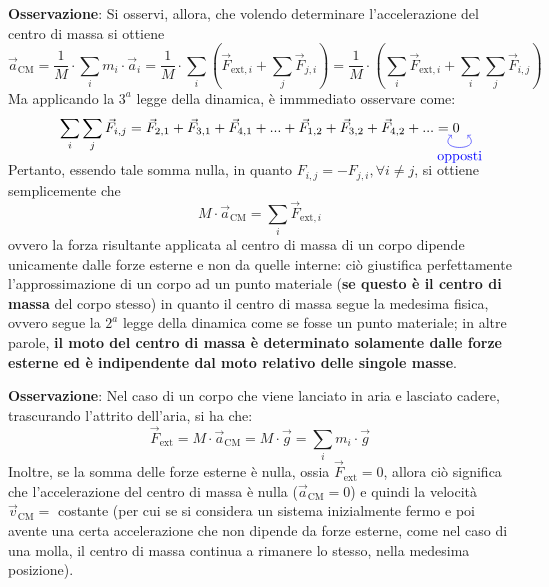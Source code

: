\documentclass[a4paper]{extarticle}
\begin{document}
\vspace{1em}
\noindent
\newcommand{\tikzmark}[1]{\tikz[overlay,remember picture] \node (#1) {};}
\textbf{Osservazione}: Si osservi, allora, che volendo determinare l'accelerazione del centro di massa si ottiene
\[\vec a_{\text{CM}} = \frac{1}{M} \cdot \sum_i m_i \cdot \vec a_i = \frac{1}{M} \cdot \sum_i \left( \vec F_{\text{ext},i} + \sum_j \vec F_{j,i} \right) = \frac{1}{M} \cdot \left(\sum_i \vec F_{\text{ext},i} + \sum_i \sum_j \vec F_{i,j}\right)\]
Ma applicando la $3^a$ legge della dinamica, è immmediato osservare come:
\begin{equation*}
  \sum_i \sum_j \vec F_{i,j} = \tikzmark{a} \vec F_{2,1} + \vec F_{3,1} + \vec F_{4,1} + ... + \vec F_{1,2} \tikzmark{b} + \vec F_{3,2} + \vec F_{4,2} + ... = 0
  \begin{tikzpicture}[overlay,remember picture,out=315,in=225,distance=0.7cm]
      \draw[<->,blue,shorten >=3pt,shorten <=3pt] (a.east) to node[midway,below](n){opposti} (b.west);
  \end{tikzpicture}
\end{equation*}
Pertanto, essendo tale somma nulla, in quanto $F_{i,j}=-F_{j,i}, \forall i \neq j$, si ottiene semplicemente che
\[\boxed{M \cdot \vec a_{\text{CM}} = \sum_i \vec F_{\text{ext},i}}\]
ovvero la forza risultante applicata al centro di massa di un corpo dipende unicamente dalle forze esterne e non da quelle interne: ciò giustifica perfettamente l'approssimazione di un corpo ad un punto materiale (\textbf{se questo è il centro di massa} del corpo stesso) in quanto il centro di massa segue la medesima fisica, ovvero segue la $2^a$ legge della dinamica come se fosse un punto materiale; in altre parole, \textbf{il moto del centro di massa è determinato solamente dalle forze esterne ed è indipendente dal moto relativo delle singole masse}.

\vspace{1em}
\noindent
\textbf{Osservazione}: Nel caso di un corpo che viene lanciato in aria e lasciato cadere, trascurando l'attrito dell'aria, si ha che:
\[\vec F_{\text{ext}} = M \cdot \vec a_{\text{CM}} = M \cdot \vec g = \sum_{i} m_i \cdot \vec g\]
Inoltre, se la somma delle forze esterne è nulla, ossia $\vec F_{\text{ext}}=0$, allora ciò significa che l'accelerazione del centro di massa è nulla ($\vec a_{\text{CM}} = 0$) e quindi la velocità $\vec v_{\text{CM}} = $ costante (per cui se si considera un sistema inizialmente fermo e poi avente una certa accelerazione che non dipende da forze esterne, come nel caso di una molla, il centro di massa continua a rimanere lo stesso, nella medesima posizione).
\end{document}
